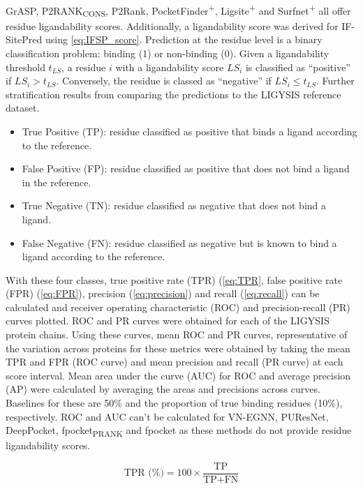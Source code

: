 GrASP, P2RANK\textsubscript{CONS}, P2Rank, PocketFinder\textsuperscript{+}, Ligsite\textsuperscript{+} and Surfnet\textsuperscript{+} all offer residue ligandability scores. Additionally, a ligandability score was derived for IF-SitePred using \autoref{eq:IFSP_score}. Prediction at the residue level is a binary classification problem: binding (1) or non-binding (0). Given a ligandability threshold $t_{LS}$, a residue $i$ with a ligandability score $LS_{i}$ is classified as ``positive'' if  $LS_{i} > t_{LS}$. Conversely, the residue is classed as ``negative'' if $LS_{i} \leq t_{LS}$. Further stratification results from comparing the predictions to the LIGYSIS reference dataset.

\begin{itemize}
\item True Positive (TP): residue classified as positive that binds a ligand according to the reference.
\item False Positive (FP): residue classified as positive that does not bind a ligand in the reference.
\item True Negative (TN): residue classified as negative that does not bind a ligand.
\item False Negative (FN): residue classified as negative but is known to bind a ligand according to the reference.
\end{itemize}

With these four classes, true positive rate (TPR) (\autoref{eq:TPR}, false positive rate (FPR) (\autoref{eq:FPR}), precision (\autoref{eq:precision}) and recall (\autoref{eq:recall}) can be calculated and receiver operating characteristic (ROC) and precision-recall (PR) curves plotted. ROC and PR curves were obtained for each of the LIGYSIS protein chains. Using these curves, mean ROC and PR curves, representative of the variation across proteins for these metrics were obtained by taking the mean TPR and FPR (ROC curve) and mean precision and recall (PR curve) at each score interval. Mean area under the curve (AUC) for ROC and average precision (AP) were calculated by averaging the areas and precisions across curves. Baselines for these are 50\% and the proportion of true binding residues (10\%), respectively. ROC and AUC can't be calculated for VN-EGNN, PUResNet, DeepPocket, fpocket\textsubscript{PRANK} and fpocket as these methods do not provide residue ligandability scores.

\begin{equation}
\text{TPR (\%)} = 100 \times \frac{\text{TP}}{\text{TP} + \text{FN}}
\label{eq:TPR}
\end{equation}

